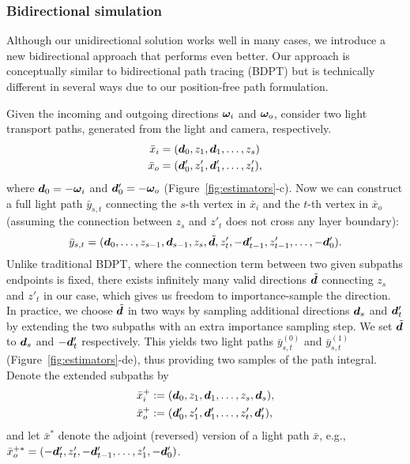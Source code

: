 \subsubsection{Bidirectional simulation}
\label{sssec:ours_bidir}
%
Although our unidirectional solution works well in many cases, we introduce a new bidirectional approach that performs even better.
Our approach is conceptually similar to bidirectional path tracing (BDPT) but is technically different in several ways due to our position-free path formulation.

Given the incoming and outgoing directions $\bm{\omega}_i$ and $\bm{\omega}_o$, consider two light transport paths, generated from the light and camera, respectively.
%
\begin{equation}
\begin{aligned}
\bar{x}_i &= (\bm{d}_0, z_1, \bm{d}_1, \ldots, z_s) \\
\bar{x}_o &= (\bm{d}'_0, z'_1, \bm{d}'_1, \ldots, z_t'),
\end{aligned}
\end{equation}
%
where $\bm{d}_0 = -\bm{\omega}_i$ and $\bm{d}'_0 = -\bm{\omega}_o$ (Figure~\ref{fig:estimators}-c).
Now we can construct a full light path $\bar{y}_{s, t}$ connecting the $s$-th vertex in $\bar{x}_i$ and the $t$-th vertex in $\bar{x}_o$ (assuming the connection between $z_s$ and $z'_t$ does not cross any layer boundary):
%
\begin{equation}
\bar{y}_{s, t} = (\bm{d}_0, \ldots, z_{s - 1}, \bm{d}_{s - 1}, z_s, \tilde{\bm{d}}, z'_t, -\bm{d}'_{t - 1}, z'_{t - 1}, \ldots, -\bm{d}'_0).
\end{equation}
%
Unlike traditional BDPT, where the connection term between two given subpaths endpoints is fixed, there exists infinitely many valid directions $\tilde{\bm{d}}$ connecting $z_s$ and $z'_t$ in our case, which gives us freedom to importance-sample the direction. In practice, we choose $\tilde{\bm{d}}$ in two ways by sampling additional directions $\bm{d}_s$ and $\bm{d}'_t$ by extending the two subpaths with an extra importance sampling step. We set $\tilde{\bm{d}}$ to $\bm{d}_s$ and $-\bm{d}'_t$ respectively. This yields two light paths $\bar{y}^{(0)}_{s, t}$ and $\bar{y}^{(1)}_{s, t}$ (Figure~\ref{fig:estimators}-de), thus providing two samples of the path integral.
Denote the extended subpaths by
%
\begin{align}
\bar{x}_i^+ &:= (\bm{d}_0, z_1, \bm{d}_1, \ldots, z_s, \bm{d}_s),\\
\bar{x}_o^+ &:= (\bm{d}'_0, z'_1, \bm{d}'_1, \ldots, z'_t, \bm{d}'_t),
\end{align}
%
and let $\bar{x}^*$ denote the adjoint (reversed) version of a light path $\bar{x}$, e.g., $\bar{x}_o^{+*} = (-\bm{d}'_t, z'_t, -\bm{d}'_{t - 1}, \ldots, z'_1, -\bm{d}'_0)$.

